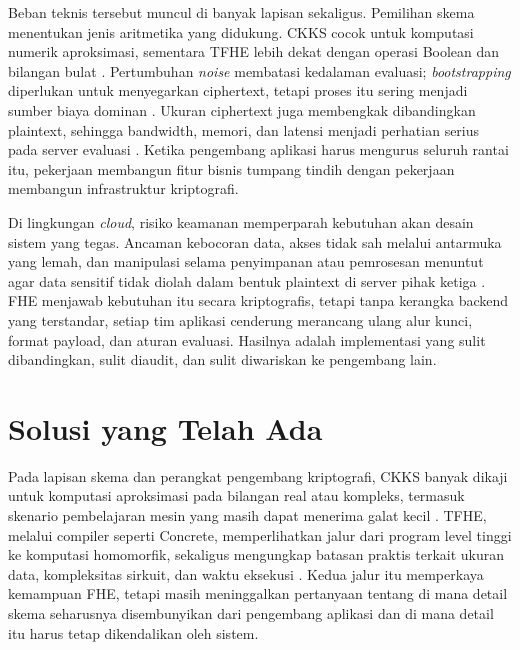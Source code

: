 \documentclass[12pt,a4paper,oneside]{report}
\begin{document}
Beban teknis tersebut muncul di banyak lapisan sekaligus. Pemilihan skema menentukan jenis aritmetika yang didukung. CKKS cocok untuk komputasi numerik aproksimasi, sementara TFHE lebih dekat dengan operasi Boolean dan bilangan bulat \cite{wu2025ckksSurvey,peker2025confidentialStatisticalFhe}. Pertumbuhan \emph{noise} membatasi kedalaman evaluasi; \emph{bootstrapping} diperlukan untuk menyegarkan ciphertext, tetapi proses itu sering menjadi sumber biaya dominan \cite{li2026bootstrappingSurvey}. Ukuran ciphertext juga membengkak dibandingkan plaintext, sehingga bandwidth, memori, dan latensi menjadi perhatian serius pada server evaluasi \cite{fan2026gpuFhe}. Ketika pengembang aplikasi harus mengurus seluruh rantai itu, pekerjaan membangun fitur bisnis tumpang tindih dengan pekerjaan membangun infrastruktur kriptografi.

Di lingkungan \emph{cloud}, risiko keamanan memperparah kebutuhan akan desain sistem yang tegas. Ancaman kebocoran data, akses tidak sah melalui antarmuka yang lemah, dan manipulasi selama penyimpanan atau pemrosesan menuntut agar data sensitif tidak diolah dalam bentuk plaintext di server pihak ketiga \cite{epishkina2025cloudHeArchitecture}. FHE menjawab kebutuhan itu secara kriptografis, tetapi tanpa kerangka backend yang terstandar, setiap tim aplikasi cenderung merancang ulang alur kunci, format payload, dan aturan evaluasi. Hasilnya adalah implementasi yang sulit dibandingkan, sulit diaudit, dan sulit diwariskan ke pengembang lain.

\section{Solusi yang Telah Ada}

Pada lapisan skema dan perangkat pengembang kriptografi, CKKS banyak dikaji untuk komputasi aproksimasi pada bilangan real atau kompleks, termasuk skenario pembelajaran mesin yang masih dapat menerima galat kecil \cite{wu2025ckksSurvey}. TFHE, melalui compiler seperti Concrete, memperlihatkan jalur dari program level tinggi ke komputasi homomorfik, sekaligus mengungkap batasan praktis terkait ukuran data, kompleksitas sirkuit, dan waktu eksekusi \cite{peker2025confidentialStatisticalFhe}. Kedua jalur itu memperkaya kemampuan FHE, tetapi masih meninggalkan pertanyaan tentang di mana detail skema seharusnya disembunyikan dari pengembang aplikasi dan di mana detail itu harus tetap dikendalikan oleh sistem.
\end{document}
